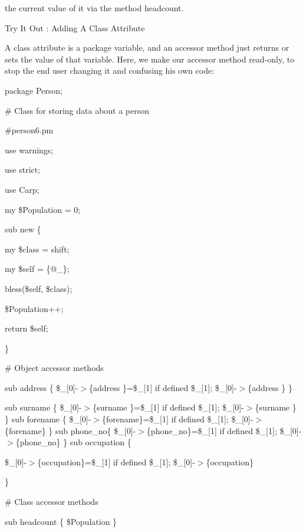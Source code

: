 \documentclass[a4paper,11pt]{book}
\begin{document}
\noindent the current value of it via the method headcount.

\noindent 

\noindent Try It Out : Adding A Class Attribute

\noindent A class attribute is a package variable, and an accessor method just returns or sets the value of that variable. Here, we make our accessor method read-only, to stop the end user changing it and confusing his own code:

\noindent 

\noindent package Person;

\noindent \# Class for storing data about a person

\noindent \#person6.pm

\noindent use warnings;

\noindent use strict;

\noindent use Carp;

\noindent 

\noindent my \$Population = 0;

\noindent 

\noindent sub new \{

\noindent my \$class = shift;

\noindent my \$self = \{@\_\};

\noindent bless(\$self, \$class);

\noindent \$Population++;

\noindent return \$self;

\noindent \}

\noindent 

\noindent \# Object accessor methods

\noindent sub address  \{ \$\_[0]-$>$\{address \}=\$\_[1] if defined \$\_[1]; \$\_[0]-$>$\{address \} \}

\noindent sub surname  \{ \$\_[0]-$>$\{surname \}=\$\_[1] if defined \$\_[1]; \$\_[0]-$>$\{surname \} \} sub forename \{ \$\_[0]-$>$\{forename\}=\$\_[1] if defined \$\_[1]; \$\_[0]-$>$\{forename\} \} sub phone\_no\{ \$\_[0]-$>$\{phone\_no\}=\$\_[1] if defined \$\_[1]; \$\_[0]-$>$\{phone\_no\} \} sub occupation  \{

\noindent \$\_[0]-$>$\{occupation\}=\$\_[1] if defined \$\_[1]; \$\_[0]-$>$\{occupation\}

\noindent \}

\noindent 

\noindent \# Class accessor methods

\noindent sub headcount \{ \$Population \}
\end{document}
